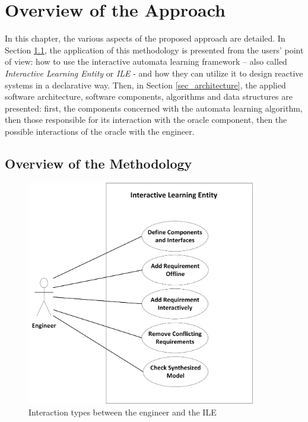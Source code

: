 \chapter{Overview of the Approach} \label{overviewoftheapproach}
In this chapter, the various aspects of the proposed approach are detailed. In Section \ref{sec_methodology}, the application of this methodology is presented from the users' point of view: how to use the interactive automata learning framework -- also called \textit{Interactive Learning Entity} or \textit{ILE} - and how they can utilize it to design reactive systems in a declarative way. Then, in Section \ref{sec_architecture}, the applied software architecture, software components, algorithms and data structures are presented: first, the components concerned with the automata learning algorithm, then those responsible for its interaction with the oracle component, then the possible interactions of the oracle with the engineer.
\section{Overview of the Methodology} \label{sec_methodology}
\begin{figure}[!ht] 
	\centering
	
		\includegraphics[width=100mm, keepaspectratio]{figures/methodology_interactiontypes.png}
	\caption{Interaction types between the engineer and the ILE}
	\label{fig_methodology_interactiontypes}
\end{figure}

